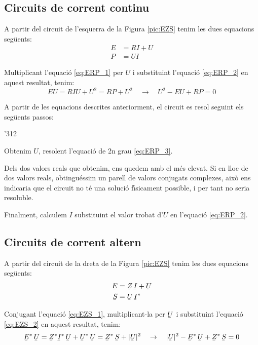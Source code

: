 \subsection{Circuits de corrent continu}

A partir del circuit de l'esquerra de la Figura \vref{pic:EZS} tenim les dues equacions seg\"{u}ents:
\begin{align}
   E &= R I + U \label{eq:ERP_1} \\
   P &= U I     \label{eq:ERP_2}
\end{align}

Multiplicant l'equaci\'{o} \eqref{eq:ERP_1} per $U$ i substituint l'equaci\'{o} \eqref{eq:ERP_2} en aquest resultat, tenim:
\begin{equation}
   E U = R I U + U^2 = R P + U^2 \quad \rightarrow \quad U^2 - E U + R P = 0 \label{eq:ERP_3}
\end{equation}

A partir de les equacions descrites anteriorment, el circuit es resol seguint els seg\"{u}ents passos:
\begin{dingautolist}{'312}
   \item Obtenim $U$, resolent l'equaci\'{o} de 2n grau \eqref{eq:ERP_3}.
   \item Dels dos valors reals que obtenim, ens quedem amb el m\'{e}s elevat. Si en lloc de dos valors reals, obtingu\'{e}ssim
   un parell de valors conjugats complexes, aix\`{o} ens indicaria que el circuit no t\'{e} una soluci\'{o} f\'{\i}sicament possible, i per tant no seria resoluble.
   \item Finalment, calculem $I$ substituint el valor trobat d'$U$ en l'equaci\'{o} \eqref{eq:ERP_2}.
\end{dingautolist}

\subsection{Circuits de corrent altern}

A partir del circuit de la dreta de la Figura \vref{pic:EZS} tenim les dues equacions seg\"{u}ents:
\begin{align}
   \cmplx{E} &= \cmplx{Z} \, \cmplx{I} + \cmplx{U} \label{eq:EZS_1} \\
   \cmplx{S} &= \cmplx{U} \, \cmplx{I}^*           \label{eq:EZS_2}
\end{align}

Conjugant l'equaci\'{o} \eqref{eq:EZS_1}, multiplicant-la per $\cmplx{U}$ i substituint l'equaci\'{o} \eqref{eq:EZS_2} en aquest resultat, tenim:
\begin{equation}
   \cmplx{E}^* \, \cmplx{U} = \cmplx{Z}^* \cmplx{I}^* \, \cmplx{U} + \cmplx{U}^* \, \cmplx{U} =
   \cmplx{Z}^* \, \cmplx{S} + |\cmplx{U}|^2 \quad \rightarrow \quad
   |\cmplx{U}|^2 - \cmplx{E}^* \, \cmplx{U} + \cmplx{Z}^* \, \cmplx{S} = 0
   \label{eq:EZS_3}
\end{equation}


